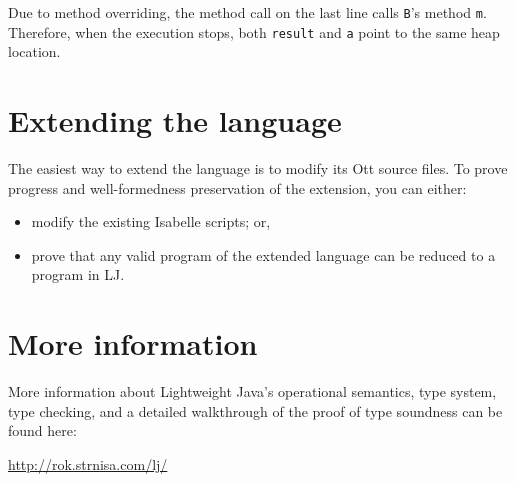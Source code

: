 \documentclass[11pt,a4paper]{article}
\begin{document}
Due to method overriding, the method call on the last line calls {\tt B}'s
method {\tt m}. Therefore, when the execution stops,
both {\tt result} and {\tt a} point to the same heap location.

\section{Extending the language}

The easiest way to extend the language is to modify its Ott source files. To
prove progress and well-formedness preservation of the extension, you can
either:

\begin{itemize}
\item modify the existing Isabelle scripts; or,
\item prove that any valid program of the extended language can be reduced to a
program in LJ.
\end{itemize}

\section{More information}

More information about Lightweight Java's operational semantics, type system,
type checking, and a detailed walkthrough of the proof of type soundness can be
found here:

\begin{center} \url{http://rok.strnisa.com/lj/} \end{center}

% 



\end{document}
